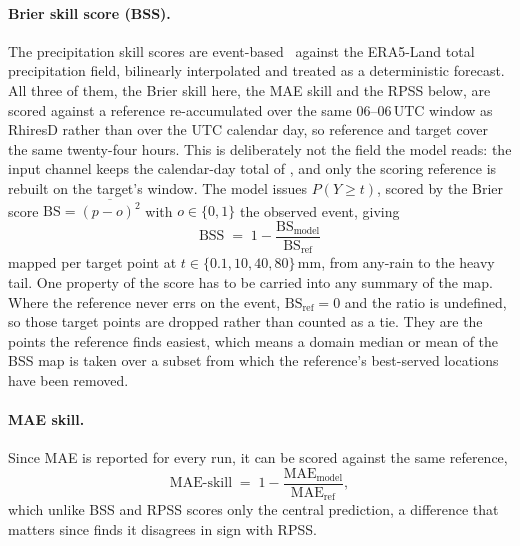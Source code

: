 \paragraph*{Brier skill score (BSS).}
The precipitation skill scores are event-based~\cite{wilks2019statistical} against the ERA5-Land total precipitation field, bilinearly interpolated and treated as a deterministic forecast. All three of them, the Brier skill here, the MAE skill and the RPSS below, are scored against a reference re-accumulated over the same $06$--$06\,\mathrm{UTC}$ window as RhiresD rather than over the UTC calendar day, so reference and target cover the same twenty-four hours. This is deliberately not the field the model reads: the input channel keeps the calendar-day total of , and only the scoring reference is rebuilt on the target's window. The model issues $P(Y \geq t)$, scored by the Brier score $\mathrm{BS} = \overline{(p - o)^{2}}$ with $o \in \{0,1\}$ the observed event, giving
\begin{equation}
    \mathrm{BSS} \;=\; 1 - \frac{\mathrm{BS}_{\mathrm{model}}}{\mathrm{BS}_{\mathrm{ref}}}
    \label{eq:bss}
\end{equation}
mapped per target point at $t \in \{0.1, 10, 40, 80\}\,\mathrm{mm}$, from any-rain to the heavy tail. One property of the score has to be carried into any summary of the map. Where the reference never errs on the event, $\mathrm{BS}_{\mathrm{ref}} = 0$ and the ratio is undefined, so those target points are dropped rather than counted as a tie. They are the points the reference finds easiest, which means a domain median or mean of the BSS map is taken over a subset from which the reference's best-served locations have been removed.

\paragraph*{MAE skill.}
Since MAE is reported for every run, it can be scored against the same reference,
\begin{equation}
    \mathrm{MAE\text{-}skill} \;=\; 1 - \frac{\mathrm{MAE}_{\mathrm{model}}}{\mathrm{MAE}_{\mathrm{ref}}} ,
    \label{eq:mae-skill}
\end{equation}
which unlike BSS and RPSS scores only the central prediction, a difference that matters since  finds it disagrees in sign with RPSS.


